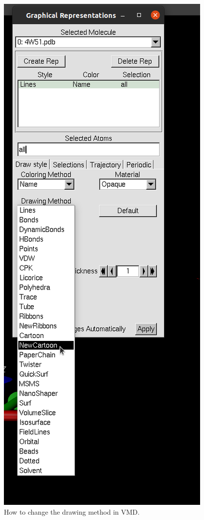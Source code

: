     \begin{figure}[H]
        \centering
        \includegraphics[height=0.7\textheight]{Graphics/ScreenShots/NewCartoonpng.png}
        \caption{How to change the drawing method in VMD.}
        \label{fig:NewCartoon}
    \end{figure}

